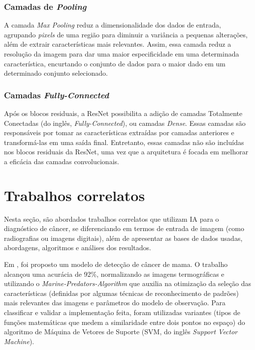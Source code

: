 \subsubsection{\esp Camadas de \textit{Pooling}} \label{convs}

A camada \textit{Max Pooling} reduz a dimensionalidade dos dados de entrada, agrupando \textit{pixels} de uma região para diminuir a variância a pequenas alterações, além de extrair características mais relevantes. Assim, essa camada reduz a resolução da imagem para dar uma maior especificidade em uma determinada característica, encurtando o conjunto de dados para o maior dado em um determinado conjunto selecionado.

\subsubsection{\esp Camadas \textit{Fully-Connected}} \label{fully}

Após os blocos residuais, a ResNet possibilita a adição de camadas Totalmente Conectadas (do inglês, \textit{Fully-Connected}), ou camadas \textit{Dense}. Essas camadas são responsáveis por tomar as características extraídas por camadas anteriores e transformá-las em uma saída final. Entretanto, essas camadas não são incluídas nos blocos residuais da ResNet, uma vez que a arquitetura é focada em melhorar a eficácia das camadas convolucionais.



\section{\esp Trabalhos correlatos} \label{trabcorr}

Nesta seção, são abordados trabalhos correlatos que utilizam IA para o diagnóstico de câncer, se diferenciando em termos de entrada de imagem (como radiografias ou imagens digitais), além de apresentar as bases de dados usadas, abordagens, algoritmos e análises dos resultados. 

Em , foi proposto um modelo de detecção de câncer de mama. O trabalho alcançou uma acurácia de 92\%, normalizando as imagens termográficas e utilizando o \textit{Marine-Predators-Algorithm} que auxilia na otimização da seleção das características (definidas por algumas técnicas de reconhecimento de padrões) mais relevantes das imagens e parâmetros do modelo de observação. Para classificar e validar a implementação feita, foram utilizadas variantes (tipos de funções matemáticas que medem a similaridade entre dois pontos no espaço) do algoritmo de Máquina de Vetores de Suporte (SVM, do inglês \textit{Support Vector Machine}).

